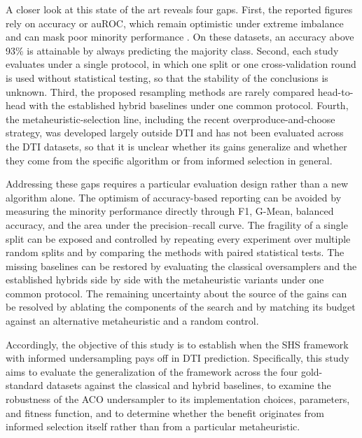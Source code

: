 \documentclass[10pt,a4paper]{article}
\begin{document}
A closer look at this state of the art reveals four gaps. First, the
reported figures rely on accuracy or auROC, which remain optimistic
under extreme imbalance and can mask poor minority performance
\citep{saito2015precision}. On these datasets, an accuracy above 93\%
is attainable by always predicting the majority class. Second, each
study evaluates under a single protocol, in which one split or one
cross-validation round is used without statistical testing, so that the
stability of the conclusions is unknown. Third, the proposed resampling
methods are rarely compared head-to-head with the established hybrid
baselines under one common protocol. Fourth, the metaheuristic-selection
line, including the recent overproduce-and-choose strategy, was
developed largely outside DTI and has not been evaluated across the DTI
datasets, so that it is unclear whether its gains generalize and whether
they come from the specific algorithm or from informed selection in
general.

Addressing these gaps requires a particular evaluation design rather
than a new algorithm alone. The optimism of accuracy-based reporting can
be avoided by measuring the minority performance directly through F1,
G-Mean, balanced accuracy, and the area under the precision--recall
curve. The fragility of a single split can be exposed and controlled by
repeating every experiment over multiple random splits and by comparing
the methods with paired statistical tests. The missing baselines can be
restored by evaluating the classical oversamplers and the established
hybrids side by side with the metaheuristic variants under one common
protocol. The remaining uncertainty about the source of the gains can be
resolved by ablating the components of the search and by matching its
budget against an alternative metaheuristic and a random control.

Accordingly, the objective of this study is to establish when the SHS
framework with informed undersampling pays off in DTI prediction.
Specifically, this study aims to evaluate the generalization of the
framework across the four gold-standard datasets against the classical
and hybrid baselines, to examine the robustness of the ACO undersampler
to its implementation choices, parameters, and fitness function, and to
determine whether the benefit originates from informed selection itself
rather than from a particular metaheuristic.
\end{document}
